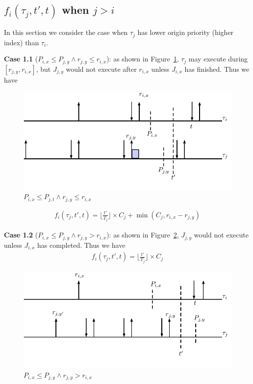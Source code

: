 % 
\subsection{$f_i(\tau_j,t',t)$ when $j> i$}
In this section we consider the case when $\tau_j$ has lower origin priority (higher index) than $\tau_i$. 

\textbf{Case 1.1} ($P_{i,x}\leq P_{j,y}\wedge r_{j,y}\leq r_{i,x}$): as shown in  Figure~\ref{fig:case3}, $\tau_j$ may execute during $[r_{j,y},r_{i,x}]$, but $J_{j,y}$ would not execute after $r_{i,x}$  unless $J_{i,x}$ has finished. Thus we have

	\begin{figure}[h!]
 \centering
\includegraphics[scale=0.7]{Figure/C3}  
\caption{$P_{i,x}\leq P_{j,t}\wedge r_{j,y}\leq r_{i,x}$}
  \label{fig:case3}
\end{figure}
		\begin{align*}
		f_i(\tau_j,t',t)=\lfloor \frac{t'}{T_j}\rfloor\times C_j+\min(C_j,r_{i,x}-r_{j,y})
	\end{align*}



\textbf{Case 1.2} ($P_{i,x}\leq P_{j,y}\wedge r_{j,y}> r_{i,x}$): as shown in  Figure~\ref{fig:case4},  $J_{j,y}$ would not execute unless $J_{i,x}$ has completed. Thus we have
\begin{align*}
		f_i(\tau_j,t',t)=\lfloor \frac{t'}{T_j}\rfloor\times C_j
\end{align*}

\begin{figure}[h!]
 \centering
\includegraphics[scale=0.7]{Figure/C31}  
\caption{$P_{i,x}\leq P_{j,y}\wedge r_{j,y}> r_{i,x}$}
  \label{fig:case4}
\end{figure}



